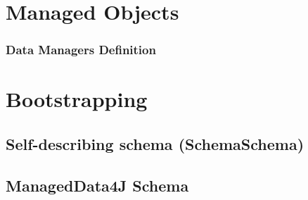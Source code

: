 \section{Managed Objects}\label{sec:Managed Objects}

\subsubsection{Data Managers Definition}\label{Data Managers Definition}




\section{Bootstrapping}\label{sec:Bootstrapping}

\subsection{Self-describing schema (SchemaSchema)}\label{sec:SchemaSchema}

\subsection{ManagedData4J Schema}\label{sec:ManagedData4J Schema}


